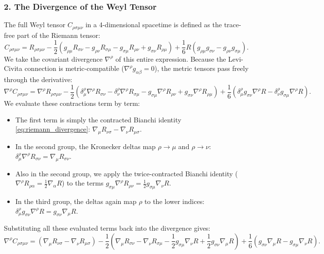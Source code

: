 \documentclass[11pt, a4paper]{report}
\begin{document}
\subsubsection*{2. The Divergence of the Weyl Tensor}
The full Weyl tensor $C_{\rho\sigma\mu\nu}$ in a 4-dimensional spacetime is defined as the trace-free part of the Riemann tensor:
\begin{equation}
\label{eq:weyl_full_def}
C_{\rho\sigma\mu\nu} = R_{\rho\sigma\mu\nu} - \frac{1}{2} \left( g_{\rho\mu}R_{\sigma\nu} - g_{\rho\nu}R_{\sigma\mu} - g_{\sigma\mu}R_{\rho\nu} + g_{\sigma\nu}R_{\rho\mu} \right) + \frac{1}{6} R \left( g_{\rho\mu}g_{\sigma\nu} - g_{\rho\nu}g_{\sigma\mu} \right).
\end{equation}
We take the covariant divergence $\nabla^{\rho}$ of this entire expression. Because the Levi-Civita connection is metric-compatible ($\nabla^{\rho}g_{\alpha\beta} = 0$), the metric tensors pass freely through the derivative:
\begin{equation}
\nabla^{\rho}C_{\rho\sigma\mu\nu} = \nabla^{\rho}R_{\rho\sigma\mu\nu} - \frac{1}{2} \left( \delta^{\rho}_{\mu}\nabla^{\rho}R_{\sigma\nu} - \delta^{\rho}_{\nu}\nabla^{\rho}R_{\sigma\mu} - g_{\sigma\mu}\nabla^{\rho}R_{\rho\nu} + g_{\sigma\nu}\nabla^{\rho}R_{\rho\mu} \right) + \frac{1}{6} \left( \delta^{\rho}_{\mu}g_{\sigma\nu}\nabla^{\rho}R - \delta^{\rho}_{\nu}g_{\sigma\mu}\nabla^{\rho}R \right).
\end{equation}
We evaluate these contractions term by term:
\begin{itemize}
    \item The first term is simply the contracted Bianchi identity \eqref{eq:riemann_divergence}: $\nabla_{\mu} R_{\nu\sigma} - \nabla_{\nu} R_{\mu\sigma}$.
    \item In the second group, the Kronecker deltas map $\rho \to \mu$ and $\rho \to \nu$: $\delta^{\rho}_{\mu}\nabla^{\rho}R_{\sigma\nu} = \nabla_{\mu}R_{\sigma\nu}$.
    \item Also in the second group, we apply the twice-contracted Bianchi identity ($\nabla^{\rho}R_{\rho\alpha} = \frac{1}{2}\nabla_{\alpha}R$) to the terms $g_{\sigma\mu}\nabla^{\rho}R_{\rho\nu} = \frac{1}{2}g_{\sigma\mu}\nabla_{\nu}R$.
    \item In the third group, the deltas again map $\rho$ to the lower indices: $\delta^{\rho}_{\mu}g_{\sigma\nu}\nabla^{\rho}R = g_{\sigma\nu}\nabla_{\mu}R$.
\end{itemize}
Substituting all these evaluated terms back into the divergence gives:
\begin{equation}
\nabla^{\rho}C_{\rho\sigma\mu\nu} = \left( \nabla_{\mu}R_{\nu\sigma} - \nabla_{\nu}R_{\mu\sigma} \right) - \frac{1}{2} \left( \nabla_{\mu}R_{\sigma\nu} - \nabla_{\nu}R_{\sigma\mu} - \frac{1}{2}g_{\sigma\mu}\nabla_{\nu}R + \frac{1}{2}g_{\sigma\nu}\nabla_{\mu}R \right) + \frac{1}{6} \left( g_{\sigma\nu}\nabla_{\mu}R - g_{\sigma\mu}\nabla_{\nu}R \right).
\end{equation}
\end{document}
